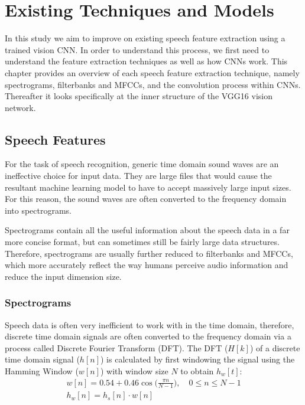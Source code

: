 \chapter{Existing Techniques and Models}
\label{chap:current_models}

In this study we aim to improve on existing speech feature extraction using a trained vision CNN.
In order to understand this process, we first need to understand the feature extraction techniques as well as how CNNs work.
This chapter provides an overview of each speech feature extraction technique, namely spectrograms, filterbanks and MFCCs, and the convolution process within CNNs. 
Thereafter it looks specifically at the inner structure of the VGG16 vision network.

\section{Speech Features}

For the task of speech recognition, generic time domain sound waves are an ineffective choice for input data. 
They are large files that would cause the resultant machine learning model to have to accept massively large input sizes. 
For this reason, the sound waves are often converted to the frequency domain into spectrograms. 

Spectrograms contain all the useful information about the speech data in a far more concise format, but can sometimes still be fairly large data structures. 
Therefore, spectrograms are usually further reduced to filterbanks and MFCCs, which more accurately reflect the way humans perceive audio information and reduce the input dimension size.

\subsection{Spectrograms}

Speech data is often very inefficient to work with in the time domain, therefore, discrete time domain signals are often converted to the frequency domain via a process called Discrete Fourier Transform (DFT). 
The DFT ($H[k]$) of a discrete time domain signal ($h[n]$) is calculated by first windowing the signal using the Hamming Window ($w[n]$) with window size $N$ to obtain $h_{w}[t]$:
\begin{gather}
    w[n] = 0.54+0.46\cos\Big(\frac{\pi n}{N-1}\Big), \quad 0 \leq n \leq N-1 \\
    h_{w}[n] = h_{s}[n] \cdot w[n]
\end{gather}

